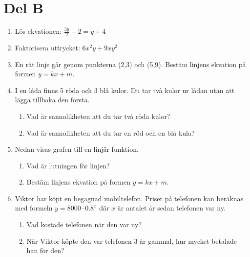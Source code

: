\documentclass[a4paper,11pt]{article}
\begin{document}
\section*{Del B}
\begin{enumerate}
    \item Lös ekvationen: $\frac{3y}{2} -2 = y + 4$
    \item Faktorisera uttrycket: $6x^2y + 9xy^2$
    \item En rät linje går genom punkterna (2,3) och (5,9). Bestäm linjens ekvation på formen $y = kx + m$.
    \item I en låda finns 5 röda och 3 blå kulor. Du tar två kulor ur lådan utan att lägga tillbaka den första.
    \begin{enumerate}[label=\alph*)]
      \item Vad är sannolikheten att du tar två röda kulor?
      \item Vad är sannolikheten att du tar en röd och en blå kula?
    \end{enumerate}
    \item Nedan visas grafen till en linjär funktion.
    \begin{enumerate}[label=\alph*)]
        \item Vad är lutningen för linjen?
        \item Bestäm linjens ekvation på formen $y = kx + m$.
    \end{enumerate}
    \begin{center}
    \end{center}
    \item Viktor har köpt en begagnad mobiltelefon. Priset på telefonen kan beräknas med formeln $y=8000 \cdot 0.8^x$ där $x$ är antalet år sedan telefonen var ny.
    \begin{enumerate}[label=\alph*)]
      \item Vad kostade telefonen när den var ny?
      \item När Viktor köpte den var telefonen 3 år gammal, hur mycket betalade han för den?

\end{enumerate}
\end{enumerate}
\end{document}
